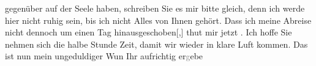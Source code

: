                gegenüber auf der Seele haben, schreiben Sie es mir bitte gleich, denn ich werde hier
               nicht ruhig sein, bis ich nicht Alles von Ihnen gehört. Dass ich meine Abreise nicht
               dennoch um einen Tag hinausgeschoben{[},{]} thut mir jetzt . Ich hoffe Sie nehmen sich die halbe Stunde
               Zeit, damit wir wieder in klare Luft kommen. Das ist nun mein ungeduldiger Wun\pend
           \pstart Ihr aufrichtig er\textcolor{gray}{g}ebe\pend{}\endnumbering{}  
      